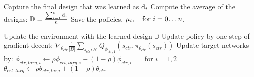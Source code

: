 \begin{algorithmic}[1]
    \State Capture the final design that was learned as $\textup{d}_i$
    \EndFor
    \State Compute the average of the designs: \newline \hspace*{5em} $\mathbb{D} = \frac{\sum_{i = 1}^{n} \textup{d}_i}{n}$
    \State Save the policies, $\mu_i,~~~\textup{for}~i=0 \dots n$,
    \EndIf 

    \EndIf
    \State Update the environment with the learned design $\mathbb{D}$
    \State Update policy by one step of gradient decent: \newline \hspace*{5em} $\nabla_{\theta_{ctr}}\frac{1}{|B|}\sum_{s_{ctr} \epsilon B} \, Q_{\phi_{ctr,1}}(s_{ctr}, \pi_{\theta_{ctr}}(s_{ctr}))$
    \State Update target networks by: \newline \hspace*{5em} $\phi_{ctr,targ,i} \leftarrow \rho \phi_{crt,targ,i} + (1 - \rho)\phi_{ctr,i}$~~~ for $i=1,2$ \newline \hspace*{5em} $\theta_{crt,targ} \leftarrow \rho \theta_{ctr,targ} + (1 - \rho)\theta_{ctr}$
    \EndIf
    \EndFor
    \EndIf
    \EndWhile
    \end{algorithmic}
